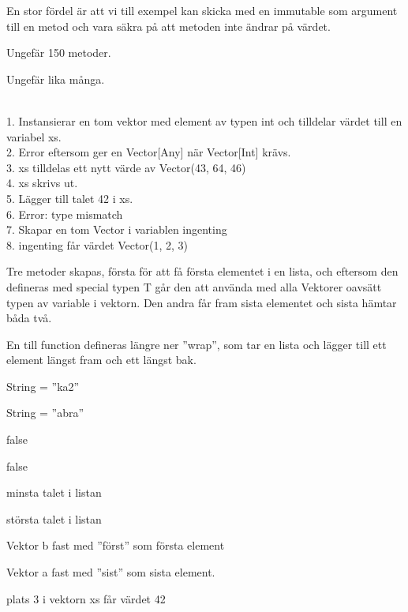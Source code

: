 \Subtask  En stor fördel är att vi till exempel kan skicka med en immutable som argument till en metod och vara säkra på att metoden inte ändrar på värdet.

\Task %

\Subtask  Ungefär 150 metoder.

\Subtask  Ungefär lika många.

\Task %

\Subtask 
\\1. Instansierar en tom vektor med element av typen int och tilldelar värdet till en variabel xs.
\\2. Error eftersom  ger en Vector[Any] när Vector[Int] krävs.
\\3. xs tilldelas ett nytt värde av Vector(43, 64, 46)
\\4. xs skrivs ut.
\\5. Lägger till talet 42 i xs.
\\6. Error: type mismatch
\\7. Skapar en tom Vector i variablen ingenting
\\8. ingenting får värdet Vector(1, 2, 3)

\Subtask 
Tre metoder skapas, första för att få första elementet i en lista, och eftersom den defineras med special typen T går den att använda med alla Vektorer oavsätt typen av variable i vektorn. Den andra får fram sista elementet och sista hämtar båda två.

En till function defineras längre ner ''wrap'', som tar en lista och lägger till ett element längst fram och ett längst bak.

\Task %

\Subtask  String = ''ka2''

\Subtask  String = ''abra''

\Subtask  false

\Subtask  false



\Subtask  minsta talet i listan

\Subtask  största talet i listan



\Subtask  Vektor b fast med ''först'' som första element

\Subtask  Vektor a fast med ''sist'' som sista element.

\Subtask  plats 3 i vektorn xs får värdet 42

